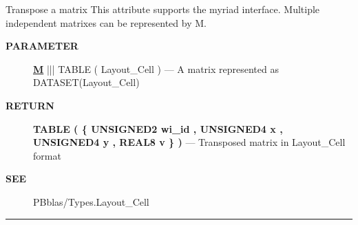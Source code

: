 Transpose a matrix This attribute supports the myriad interface. Multiple independent matrixes can be represented by M.






\par
\begin{description}
\item [\colorbox{tagtype}{\color{white} \textbf{\textsf{PARAMETER}}}] \textbf{\underline{M}} ||| TABLE ( Layout\_Cell ) --- A matrix represented as DATASET(Layout\_Cell)
\end{description}







\par
\begin{description}
\item [\colorbox{tagtype}{\color{white} \textbf{\textsf{RETURN}}}] \textbf{TABLE ( \{ UNSIGNED2 wi\_id , UNSIGNED4 x , UNSIGNED4 y , REAL8 v \} )} --- Transposed matrix in Layout\_Cell format
\end{description}






\par
\begin{description}
\item [\colorbox{tagtype}{\color{white} \textbf{\textsf{SEE}}}] PBblas/Types.Layout\_Cell
\end{description}




\rule{\linewidth}{0.5pt}


